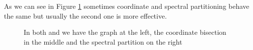 \documentclass[]{usiinfbachelorproject}
\begin{document}
As we can see in Figure \ref{fig:partitioning} sometimes coordinate and spectral partitioning behave the same but usually the second one is more effective.
\begin{figure}[ht]
	\centering
	\caption{In both  and  we have the graph at the left, the coordinate bisection in the middle and the spectral partition on the right}
	\label{fig:partitioning}
\end{figure}
\end{document}
